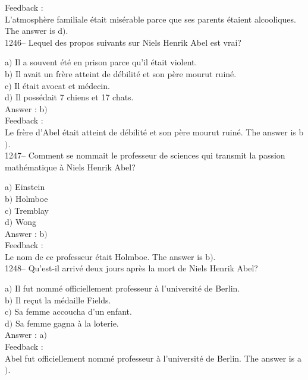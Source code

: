 \documentclass[letterpaper, 12pt]{article}
\begin{document}
Feedback : \\
L'atmosph\`ere familiale \'etait mis\'erable parce que ses parents
\'etaient alcooliques.
The answer is d$)$.\\

1246-- Lequel des propos suivants sur Niels Henrik Abel est vrai?

a$)$ Il a souvent \'et\'e en prison parce qu'il \'etait violent. \\
b$)$ Il avait un fr\`ere atteint de d\'ebilit\'e et son p\`ere mourut
ruin\'e. \\
c$)$ Il \'etait avocat et m\'edecin. \\
d$)$ Il poss\'edait 7 chiens et 17 chats.  \\

Answer : b$)$\\

Feedback : \\
Le fr\`ere d'Abel \'etait atteint de d\'ebilit\'e et son p\`ere
mourut ruin\'e.
The answer is b$)$.\\

1247-- Comment se nommait le professeur de sciences qui transmit la
passion math\'ematique \`a Niels Henrik Abel?

a$)$ Einstein \\
b$)$ Holmboe \\
c$)$ Tremblay \\
d$)$ Wong\\

Answer : b$)$\\

Feedback : \\
Le nom de ce professeur \'etait Holmboe.
The answer is b$)$.\\

1248-- Qu'est-il arriv\'e deux jours apr\`es la mort de Niels Henrik
Abel?

a$)$ Il fut nomm\'e officiellement professeur \`a l'universit\'e de Berlin.
\\
b$)$ Il re\c cut la m\'edaille Fields. \\
c$)$ Sa femme accoucha d'un enfant. \\
d$)$ Sa femme gagna \`a la loterie.\\

Answer : a$)$\\

Feedback : \\
Abel fut officiellement nomm\'e professeur \`a l'universit\'e de
Berlin.
The answer is a$)$.\\
\end{document}
